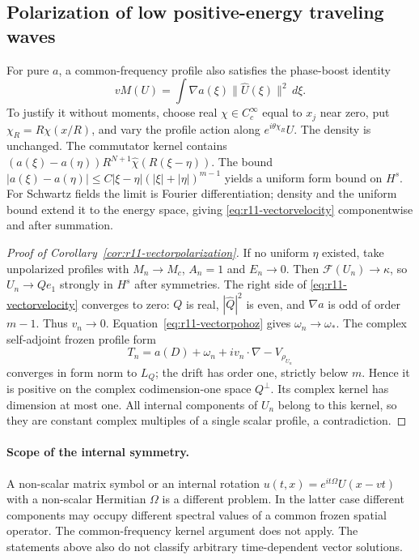 \subsection{Polarization of low positive-energy traveling waves}
For pure $a$, a common-frequency profile also satisfies the phase-boost
identity
\begin{equation}\label{eq:r11-vectorvelocity}
 vM(U)=\int\nabla a(\xi)\|\widehat U(\xi)\|^2\,d\xi.
\end{equation}
To justify it without moments, choose real $\chi\in C_c^\infty$
equal to $x_j$ near zero, put $\chi_R=R\chi(x/R)$, and vary the
profile action along $e^{i\theta\chi_R}U$. The density is unchanged.
The commutator kernel contains
$(a(\xi)-a(\eta))R^{N+1}\widehat\chi(R(\xi-\eta))$.
The bound
$|a(\xi)-a(\eta)|\le C|\xi-\eta|(|\xi|+|\eta|)^{m-1}$
yields a uniform form bound on $H^s$.
For Schwartz fields the limit is Fourier differentiation; density
and the uniform bound extend it to the energy space, giving
\eqref{eq:r11-vectorvelocity} componentwise and after summation.

\begin{proof}[Proof of Corollary~\ref{cor:r11-vectorpolarization}]
If no uniform $\eta$ existed, take unpolarized profiles with
$M_n\to M_c$, $A_n=1$ and $E_n\to0$.
Then $\mathcal F(U_n)\to\kappa$, so $U_n\to Qe_1$ strongly
in $H^s$ after symmetries. The right side of
\eqref{eq:r11-vectorvelocity} converges to zero: $Q$ is real,
$|\widehat Q|^2$ is even, and $\nabla a$ is odd of order $m-1$.
Thus $v_n\to0$.
Equation~\eqref{eq:r11-vectorpohoz} gives $\omega_n\to\omega_*$.
The complex self-adjoint frozen profile form
\[
 T_n=a(D)+\omega_n+iv_n\cdot\nabla-V_{\rho_{U_n}}
\]
converges in form norm to $L_Q$; the drift has order one, strictly
below $m$. Hence it is positive on the complex codimension-one space
$Q^\perp$. Its complex kernel has dimension at most one. All internal
components of $U_n$ belong to this kernel, so they are constant complex
multiples of a single scalar profile, a contradiction.
\end{proof}

\paragraph{Scope of the internal symmetry.}
A non-scalar matrix symbol or an internal rotation
$u(t,x)=e^{it\Omega}U(x-vt)$ with a non-scalar Hermitian $\Omega$
is a different problem. In the latter case different components may
occupy different spectral values of a common frozen spatial operator.
The common-frequency kernel argument does not apply. The statements
above also do not classify arbitrary time-dependent vector solutions.

